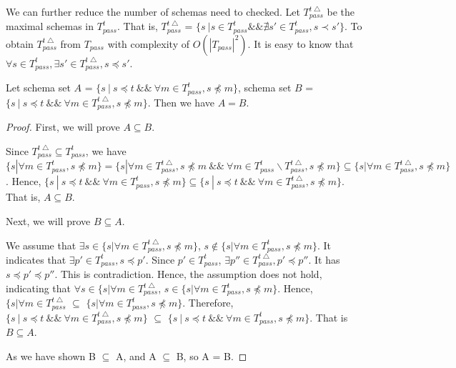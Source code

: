 We can further reduce the number of schemas need to checked. Let $T_{pass}^{t\bigtriangleup}$ be the maximal schemas in $T_{pass}^{t}$. That is, $T_{pass}^{t\bigtriangleup}$ = $\{ s\ |  s \in T_{pass}^{t} \&\& \nexists s'  \in T_{pass}^{t}, s \prec s' \}$.  To obtain $T_{pass}^{t\bigtriangleup}$ from $T_{pass}$ with complexity of $O(|T_{pass}|^{2})$. It is easy to know that $\forall s \in T_{pass}^{t}, \exists s' \in T_{pass}^{t\bigtriangleup},  s \preceq s'$.

\begin{proposition}\label{pro:healthysintequal2}
Let schema set $A$ = $\{ s\ |\ s \preceq t\ \&\&\ \forall m \in T_{pass}^{t}, s \npreceq m \}$, schema set $B$ = $\{ s\ |\ s \preceq t\ \&\&\ \forall m \in T_{pass}^{t\bigtriangleup}, s \npreceq m \}$. Then we have $A = B$.
\end{proposition}

\begin{proof}

First, we will prove $A \subseteq B$.

Since $T_{pass}^{t\bigtriangleup} \subseteq T_{pass}^{t}$, we have $  \{ s | \forall m \in T_{pass}^{t}, s \npreceq m \} =  \{ s | \forall m \in T_{pass}^{t\bigtriangleup}, s \npreceq m \ \&\& \  \forall m \in T_{pass}^{t} \backslash T_{pass}^{t\bigtriangleup}, s \npreceq m \} \subseteq \{ s | \forall m \in T_{pass}^{t\bigtriangleup}, s \npreceq m \}$. Hence,  $\{ s\ |\ s \preceq t\ \&\&\ \forall m \in T_{pass}^{t}, s \npreceq m \} \subseteq  \{ s\ |\ s \preceq t\ \&\&\ \forall m \in T_{pass}^{t\bigtriangleup}, s \npreceq m \}$. That is,  $A \subseteq B$.

Next, we will prove $B \subseteq A$.

We assume that  $\exists s \in  \{ s | \forall m \in T_{pass}^{t\bigtriangleup}, s \npreceq m \}$, $ s \notin \{ s | \forall m \in T_{pass}^{t}, s \npreceq m \}$. It indicates that $\exists p' \in T_{pass}^{t}, s \preceq p'$. Since $p' \in T_{pass}^{t}$, $\exists p'' \in T_{pass}^{t\bigtriangleup}, p' \preceq p''$. It has $s \preceq p' \preceq p''$. This is contradiction.  Hence, the assumption does not hold, indicating that $\forall s \in  \{ s | \forall m \in T_{pass}^{t\bigtriangleup}$, $s \in  \{ s | \forall m \in T_{pass}^{t}, s \npreceq m \}$. Hence, $\{ s | \forall m \in T_{pass}^{t\bigtriangleup}$ $\subseteq$ $\{ s | \forall m \in T_{pass}^{t}, s \npreceq m \}$. Therefore, $\{ s\ |\ s \preceq t\ \&\&\ \forall m \in T_{pass}^{t\bigtriangleup}, s \npreceq m \}$ $\subseteq$ $\{ s\ |\ s \preceq t\ \&\&\ \forall m \in T_{pass}^{t}, s \npreceq m \} $. That is $B \subseteq A$.

As we have shown B $\subseteq$ A, and A $\subseteq$ B, so A = B.
\end{proof}

